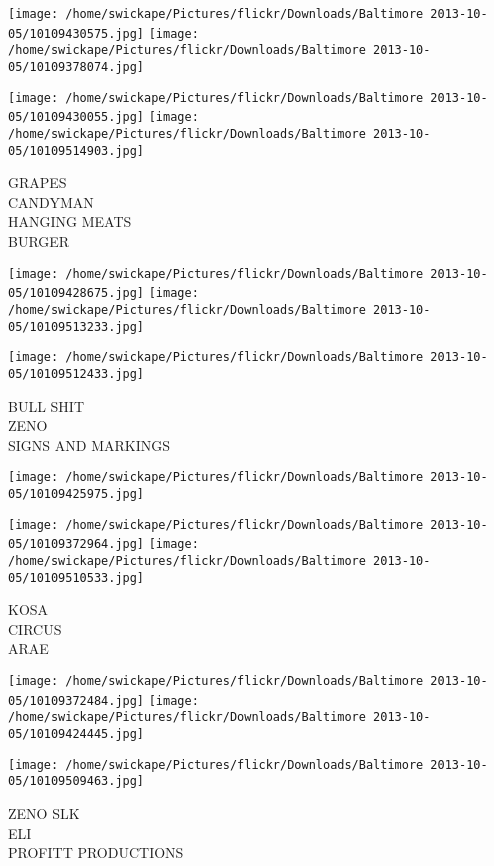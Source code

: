 \documentclass[10pt,letterpaper]{article}
\begin{document}
\texttt{[image: /home/swickape/Pictures/flickr/Downloads/Baltimore 2013-10-05/10109430575.jpg]}
\texttt{[image: /home/swickape/Pictures/flickr/Downloads/Baltimore 2013-10-05/10109378074.jpg]}

\texttt{[image: /home/swickape/Pictures/flickr/Downloads/Baltimore 2013-10-05/10109430055.jpg]}
\texttt{[image: /home/swickape/Pictures/flickr/Downloads/Baltimore 2013-10-05/10109514903.jpg]}

GRAPES\\
CANDYMAN\\
HANGING MEATS\\
BURGER
\pagebreak

\texttt{[image: /home/swickape/Pictures/flickr/Downloads/Baltimore 2013-10-05/10109428675.jpg]}
\texttt{[image: /home/swickape/Pictures/flickr/Downloads/Baltimore 2013-10-05/10109513233.jpg]}

\texttt{[image: /home/swickape/Pictures/flickr/Downloads/Baltimore 2013-10-05/10109512433.jpg]}

BULL SHIT\\
ZENO\\
SIGNS AND MARKINGS
\pagebreak

\texttt{[image: /home/swickape/Pictures/flickr/Downloads/Baltimore 2013-10-05/10109425975.jpg]}

\vspace{0.25in}
\texttt{[image: /home/swickape/Pictures/flickr/Downloads/Baltimore 2013-10-05/10109372964.jpg]}
\texttt{[image: /home/swickape/Pictures/flickr/Downloads/Baltimore 2013-10-05/10109510533.jpg]}

KOSA\\
CIRCUS\\
ARAE
\pagebreak

\texttt{[image: /home/swickape/Pictures/flickr/Downloads/Baltimore 2013-10-05/10109372484.jpg]}
\texttt{[image: /home/swickape/Pictures/flickr/Downloads/Baltimore 2013-10-05/10109424445.jpg]}

\vspace{0.25in}
\texttt{[image: /home/swickape/Pictures/flickr/Downloads/Baltimore 2013-10-05/10109509463.jpg]}

ZENO SLK\\
ELI\\
PROFITT PRODUCTIONS
\pagebreak
\end{document}
